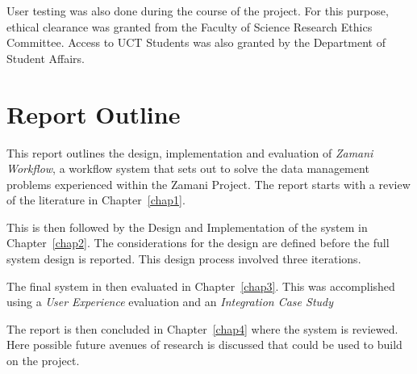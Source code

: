    User testing was also done during the course of the project. For
    this purpose, ethical clearance was granted from the Faculty of
    Science Research Ethics Committee. Access to UCT Students was also
    granted by the Department of Student Affairs.

\section{Report Outline}
    This report outlines the design, implementation and evaluation
    of \emph{Zamani Workflow}, a workflow system that sets out to
    solve the data management problems experienced within the
    Zamani Project. The report starts with a review of the literature in
    Chapter~\ref{chap1}.

    This is then followed by the Design and Implementation of the system
    in Chapter~\ref{chap2}. The considerations for the design are defined
    before the full system design is reported. This design process involved
    three iterations.  

    The final system in then evaluated in Chapter~\ref{chap3}. This was accomplished 
    using a \emph{User Experience} evaluation and an \emph{Integration Case Study}

    The report is then concluded in Chapter~\ref{chap4} where the system is 
    reviewed. Here possible future avenues of research is discussed that could
    be used to build on the project.
